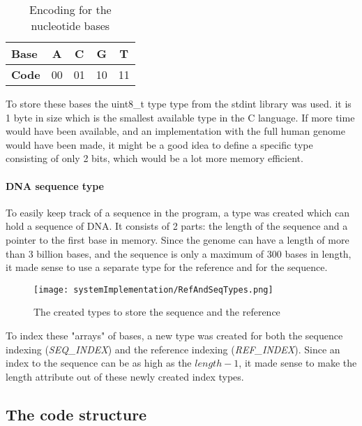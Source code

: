 \begin{table}[H]
	\centering
	\begin{tabular}{|l|c|c|c|c|}
		\hline
		\textbf{Base} & A  & C  & G  & T  \\ \hline
		\textbf{Code} & 00 & 01 & 10 & 11 \\ \hline
	\end{tabular}
	\caption{\centering Encoding for the nucleotide bases}
\end{table}

To store these bases the uint8\_t type type from the stdint library was used. it is 1 byte in size which is the smallest available type in the C language. If more time would have been available, and an implementation with the full human genome would have been made, it might be a good idea to define a specific type consisting of only 2 bits, which would be a lot more memory efficient.

\paragraph{DNA sequence type} To easily keep track of a sequence in the program, a type was created which can hold a sequence of DNA. It consists of 2 parts: the length of the sequence and a pointer to the first base in memory. 
Since the genome can have a length of more than 3 billion bases, and the sequence is only a maximum of 300 bases in length, it made sense to use a separate type for the reference and for the sequence.\\

\begin{figure}[H]
	\centering
	\texttt{[image: systemImplementation/RefAndSeqTypes.png]}
	\caption{The created types to store the sequence and the reference}
	\label{fig:RefAndSeqTypes}
\end{figure}

To index these "arrays" of bases, a new type was created for both the sequence indexing (\emph{SEQ\_INDEX}) and the reference indexing (\emph{REF\_INDEX}). Since an index to the sequence can be as high as the $length - 1$, it made sense to make the length attribute out of these newly created index types.

\subsection{The code structure}

